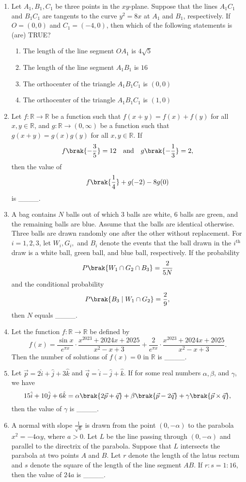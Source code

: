 \documentclass[12pt,a4paper]{article}
\begin{document}
\begin{enumerate}
\item Let $A_1, B_1, C_1$ be three points in the $xy$-plane. Suppose that the lines $A_1C_1$ and $B_1C_1$ are tangents to the curve $y^2 = 8x$ at $A_1$ and $B_1$, respectively. If $O = (0,0)$ and $C_1 = (-4,0)$, then which of the following statements is (are) TRUE?

\begin{enumerate}[label=\Alph*.]
    \item The length of the line segment $OA_1$ is $4\sqrt{5}$
    \item The length of the line segment $A_1B_1$ is $16$
    \item The orthocenter of the triangle $A_1B_1C_1$ is $(0,0)$
    \item The orthocenter of the triangle $A_1B_1C_1$ is $(1,0)$
\end{enumerate}
\item Let $f : \mathbb{R} \to \mathbb{R}$ be a function such that $f(x+y) = f(x) + f(y)$ for all $x, y \in \mathbb{R}$, and $g : \mathbb{R} \to (0, \infty)$ be a function such that $g(x+y) = g(x) g(y)$ for all $x, y \in \mathbb{R}$. If 
\[
f\brak{-\frac{3}{5}} = 12 \quad\text{and}\quad g\brak{-\frac{1}{3}} = 2,
\]
then the value of 
\[
f\brak{\frac{1}{4}} + g(-2) - 8 g(0)
\]
is \_\_\_\_.

\item A bag contains $N$ balls out of which $3$ balls are white, $6$ balls are green, and the remaining balls are blue. Assume that the balls are identical otherwise. Three balls are drawn randomly one after the other without replacement. For $i = 1,2,3$, let $W_i, G_i,$ and $B_i$ denote the events that the ball drawn in the $i^{\text{th}}$ draw is a white ball, green ball, and blue ball, respectively. If the probability 
\[
P\brak{W_1 \cap G_2 \cap B_3} = \frac{2}{5N}
\]
and the conditional probability 
\[
P\brak{B_3 \mid W_1 \cap G_2} = \frac{2}{9},
\]
then $N$ equals \_\_\_\_.
\item Let the function $f : \mathbb{R} \to \mathbb{R}$ be defined by
\[
f(x) = \frac{\sin x}{e^{\pi x}} \cdot \frac{x^{2023} + 2024x + 2025}{x^2 - x + 3} + \frac{2}{e^{\pi x}} \cdot \frac{x^{2023} + 2024x + 2025}{x^2 - x + 3}.
\]
Then the number of solutions of $f(x) = 0$ in $\mathbb{R}$ is \_\_\_\_.

\item Let $\vec{p} = 2\hat{i} + \hat{j} + 3\hat{k}$ and $\vec{q} = \hat{i} - \hat{j} + \hat{k}$. If for some real numbers $\alpha, \beta$, and $\gamma$, we have
\[
15\hat{i} + 10\hat{j} + 6\hat{k} = \alpha \brak{2\vec{p} + \vec{q}} + \beta \brak{\vec{p} - 2\vec{q}} + \gamma \brak{\vec{p} \times \vec{q}},
\]
then the value of $\gamma$ is \_\_\_\_.
\item A normal with slope $ \frac{1}{\sqrt{6}} $ is drawn from the point $ (0,-\alpha) $ to the parabola $ x^2 = -4\alpha y $, where $ a > 0 $. Let $ L $ be the line passing through $ (0,-\alpha) $ and parallel to the directrix of the parabola. Suppose that $ L $ intersects the parabola at two points $ A $ and $ B $. Let $ r $ denote the length of the latus rectum and $ s $ denote the square of the length of the line segment $ AB $. If $ r:s = 1:16 $, then the value of $ 24a $ is \_\_\_\_.


\end{enumerate}
\end{document}

